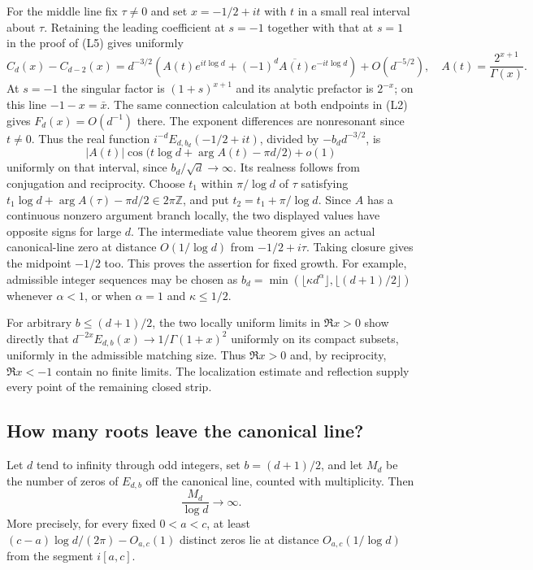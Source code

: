\documentclass[11pt,a4paper]{article}
\theoremstyle{definition}\newtheorem{problem}[theorem]{Problem}
\begin{document}
For the middle line fix $\tau\ne0$ and set $x=-1/2+it$ with $t$ in a small real interval about $\tau$. Retaining the leading coefficient at $s=-1$ together with that at $s=1$ in the proof of (L5) gives uniformly
\[
 C_d(x)-C_{d-2}(x)=d^{-3/2}\left(A(t)e^{it\log d}+(-1)^d\overline{A(t)}e^{-it\log d}\right)+O(d^{-5/2}),
 \quad A(t)=\frac{2^{x+1}}{\Gamma(x)}.
\]
At $s=-1$ the singular factor is $(1+s)^{x+1}$ and its analytic prefactor is $2^{-x}$; on this line $-1-x=\bar x$. The same connection calculation at both endpoints in (L2) gives $F_d(x)=O(d^{-1})$ there. The exponent differences are nonresonant since $t\ne0$. Thus the real function $i^{-d}E_{d,b_d}(-1/2+it)$, divided by $-b_d d^{-3/2}$, is
\[
 |A(t)|\cos\bigl(t\log d+\arg A(t)-\pi d/2\bigr)+o(1)
\]
uniformly on that interval, since $b_d/\sqrt d\to\infty$. Its realness follows from conjugation and reciprocity. Choose $t_1$ within $\pi/\log d$ of $\tau$ satisfying $t_1\log d+\arg A(\tau)-\pi d/2\in2\pi\mathbb Z$, and put $t_2=t_1+\pi/\log d$. Since $A$ has a continuous nonzero argument branch locally, the two displayed values have opposite signs for large $d$. The intermediate value theorem gives an actual canonical-line zero at distance $O(1/\log d)$ from $-1/2+i\tau$. Taking closure gives the midpoint $-1/2$ too. This proves the assertion for fixed growth. For example, admissible integer sequences may be chosen as $b_d=\min(\lfloor\kappa d^\alpha\rfloor,\lfloor(d+1)/2\rfloor)$ whenever $\alpha<1$, or when $\alpha=1$ and $\kappa\le 1/2$.

For arbitrary $b\le(d+1)/2$, the two locally uniform limits in $\Re x>0$ show directly that $d^{-2x}E_{d,b}(x)\to1/\Gamma(1+x)^2$ uniformly on its compact subsets, uniformly in the admissible matching size. Thus $\Re x>0$ and, by reciprocity, $\Re x<-1$ contain no finite limits. The localization estimate and reflection supply every point of the remaining closed strip.

\subsection{How many roots leave the canonical line?}
Let $d$ tend to infinity through odd integers, set $b=(d+1)/2$,
and let $M_d$ be the number of zeros of $E_{d,b}$ off the
canonical line, counted with multiplicity. Then
\[
                         \frac{M_d}{\log d}\longrightarrow\infty .
\]
More precisely, for every fixed $0<a<c$, at least
$(c-a)\log d/(2\pi)-O_{a,c}(1)$ distinct zeros lie at distance
$O_{a,c}(1/\log d)$ from the segment $i[a,c]$.
\end{document}
